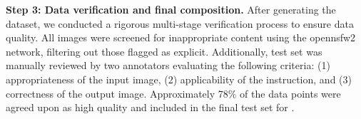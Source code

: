 \noindent\textbf{Step 3: Data verification and final composition.}
After generating the dataset, we conducted a rigorous multi-stage verification process to ensure data quality. All images were screened for inappropriate content using the opennsfw2\cite{bhky_opennsfw2} network, filtering out those flagged as explicit.  Additionally, \RealEdit test set was manually reviewed by two annotators evaluating the following criteria:
(1) appropriateness of the input image, (2) applicability of the instruction, and (3) correctness of the output image. Approximately 78\% of the data points were agreed upon as high quality and included in the final test set for \RealEdit.







